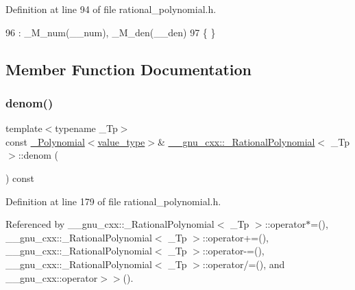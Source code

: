 Definition at line 94 of file rational\+\_\+polynomial.\+h.


\begin{DoxyCode}
96       : \_M\_num(\_\_num), \_M\_den(\_\_den)
97       \{ \}
\end{DoxyCode}


\subsection{Member Function Documentation}
\mbox{\label{class____gnu__cxx_1_1__RationalPolynomial_a05e84913ccfddcf6fcbfe623cb56c937}} 
\subsubsection{\texorpdfstring{denom()}{denom()}\hspace{0.1cm}{\footnotesize\ttfamily [1/2]}}
{\footnotesize\ttfamily template$<$typename \+\_\+\+Tp$>$ \\
const \hyperlink{class____gnu__cxx_1_1__Polynomial}{\+\_\+\+Polynomial}$<$\hyperlink{class____gnu__cxx_1_1__RationalPolynomial_adeec7f1bec03111031599f337848ee8b}{value\+\_\+type}$>$\& \hyperlink{class____gnu__cxx_1_1__RationalPolynomial}{\+\_\+\+\_\+gnu\+\_\+cxx\+::\+\_\+\+Rational\+Polynomial}$<$ \+\_\+\+Tp $>$\+::denom (\begin{DoxyParamCaption}{ }\end{DoxyParamCaption}) const\hspace{0.3cm}{\ttfamily [inline]}}



Definition at line 179 of file rational\+\_\+polynomial.\+h.



Referenced by \+\_\+\+\_\+gnu\+\_\+cxx\+::\+\_\+\+Rational\+Polynomial$<$ \+\_\+\+Tp $>$\+::operator$\ast$=(), \+\_\+\+\_\+gnu\+\_\+cxx\+::\+\_\+\+Rational\+Polynomial$<$ \+\_\+\+Tp $>$\+::operator+=(), \+\_\+\+\_\+gnu\+\_\+cxx\+::\+\_\+\+Rational\+Polynomial$<$ \+\_\+\+Tp $>$\+::operator-\/=(), \+\_\+\+\_\+gnu\+\_\+cxx\+::\+\_\+\+Rational\+Polynomial$<$ \+\_\+\+Tp $>$\+::operator/=(), and \+\_\+\+\_\+gnu\+\_\+cxx\+::operator$>$$>$().


